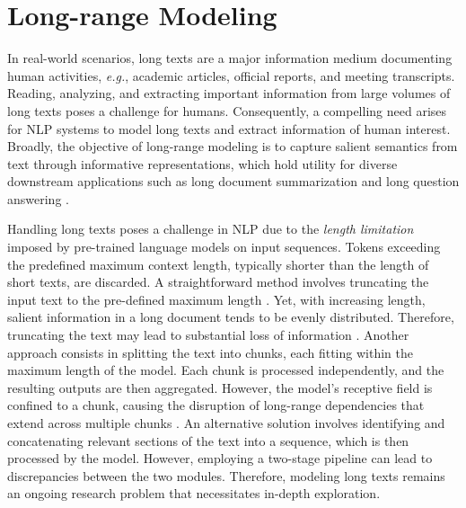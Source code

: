 \chapter{Long-range Modeling}
\label{chapter:related-long-range-modeling}


\renewcommand{\leftmark}{\spacedlowsmallcaps{Long-range Modeling}}


\minitoc



In real-world scenarios, long texts are a major information medium documenting human activities, \textit{e.g.}, academic articles, official reports, and meeting transcripts. Reading, analyzing, and extracting important information from large volumes of long texts poses a challenge for humans. Consequently, a compelling need arises for \ac{NLP} systems to model long texts and extract information of human interest. Broadly, the objective of long-range modeling is to capture salient semantics from text through informative representations, which hold utility for diverse downstream applications such as long document summarization \citep{cohan2018discourse, sharma2019bigpatent} and long question answering \citep{dasigi2021dataset}.
 
Handling long texts poses a challenge in \ac{NLP} due to the \textit{length limitation} imposed by pre-trained language models on input sequences. Tokens exceeding the predefined maximum context length, typically shorter than the length of short texts, are discarded. A straightforward method involves truncating the input text to the pre-defined maximum length \citep{lewis2019bart}. Yet, with increasing length, salient information in a long document tends to be evenly distributed. Therefore, truncating the text may lead to substantial loss of information \citep{koh2022empirical}. Another approach consists in splitting the text into chunks, each fitting within the maximum length of the model. Each chunk is processed independently, and the resulting outputs are then aggregated. However, the model's receptive field is confined to a chunk, causing the disruption of long-range dependencies that extend across multiple chunks \citep{ding2020cogltx}. An alternative solution involves identifying and concatenating relevant sections of the text into a sequence, which is then processed by the model. However, employing a two-stage pipeline can lead to discrepancies between the two modules.
Therefore, modeling long texts remains an ongoing research problem that necessitates in-depth exploration.


